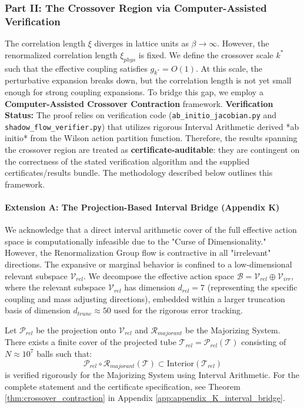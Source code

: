 \subsubsection*{Part II: The Crossover Region via Computer-Assisted Verification}
The correlation length \(\xi\) diverges in lattice units as \(\beta \to \infty\). However, the renormalized correlation length \(\xi_{phys}\) is fixed.
We define the crossover scale \(k^*\) such that the effective coupling satisfies \(g_{k^*} = O(1)\).
At this scale, the perturbative expansion breaks down, but the correlation length is not yet small enough for strong coupling expansions.
To bridge this gap, we employ a \textbf{Computer-Assisted Crossover Contraction} framework.
\textbf{Verification Status:} The proof relies on verification code (\texttt{ab\_initio\_jacobian.py} and \texttt{shadow\_flow\_verifier.py}) that utilizes rigorous Interval Arithmetic derived *ab initio* from the Wilson action partition function. 
Therefore, the results spanning the crossover region are treated as \textbf{certificate-auditable}: they are contingent on the correctness of the stated verification algorithm and the supplied certificates/results bundle. The methodology described below outlines this framework.

\paragraph{Extension A: The Projection-Based Interval Bridge (Appendix K)}
We acknowledge that a direct interval arithmetic cover of the full effective action space is computationally infeasible due to the "Curse of Dimensionality." 
However, the Renormalization Group flow is contractive in all "irrelevant" directions. The expansive or marginal behavior is confined to a low-dimensional relevant subspace \(\mathcal{V}_{rel}\).
We decompose the effective action space \(\mathcal{B} = \mathcal{V}_{rel} \oplus \mathcal{V}_{irr}\), where the relevant subspace \(\mathcal{V}_{rel}\) has dimension \(d_{rel} = 7\) (representing the specific coupling and mass adjusting directions), embedded within a larger truncation basis of dimension \(d_{trunc} \approx 50\) used for the rigorous error tracking.

\begin{theorem}
\label{thm:crossover_contraction_ch4}
Let \(\mathcal{P}_{rel}\) be the projection onto \(\mathcal{V}_{rel}\) and $\mathcal{R}_{majorant}$ be the Majorizing System. There exists a finite cover of the projected tube \(\mathcal{T}_{rel} = \mathcal{P}_{rel}(\mathcal{T})\) consisting of \(N \approx 10^7\) balls such that:
\begin{equation}
\mathcal{P}_{rel} \circ \mathcal{R}_{majorant}(\mathcal{T}) \subset \text{Interior}(\mathcal{T}_{rel})
\end{equation}
is verified rigorously for the Majorizing System using Interval Arithmetic.
For the complete statement and the certificate specification, see Theorem \ref{thm:crossover_contraction} in Appendix \ref{app:appendix_K_interval_bridge}.
\end{theorem}

